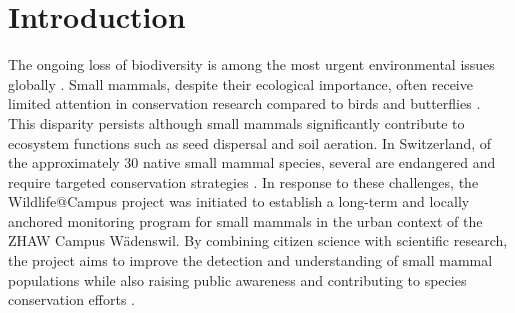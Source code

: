 

\section{Introduction}
\label{introduction}

The ongoing loss of biodiversity is among the most urgent environmental issues globally \autocite{brondizioGlobalAssessmentReport2019, cardinaleBiodiversityLossIts2012}.
Small mammals, despite their ecological importance, often receive limited attention in conservation research compared to birds and butterflies \autocite{grafWildlifeCampusKleineSaeugetiere2022}.
This disparity persists although small mammals significantly contribute to ecosystem functions such as seed dispersal and soil aeration.
In Switzerland, of the approximately 30 native small mammal species, several are endangered and require targeted conservation strategies \autocite{bafuListeNationalPrioritaren2019}.
In response to these challenges, the Wildlife@Campus project was initiated to establish a long-term and locally anchored monitoring program for small mammals in the urban context of the \ac{ZHAW} Campus Wädenswil.
By combining citizen science with scientific research, the project aims to improve the detection and understanding of small mammal populations while also raising public awareness and contributing to species conservation efforts \autocite{grafWildlifeCampusKleineSaeugetiere2022}.

